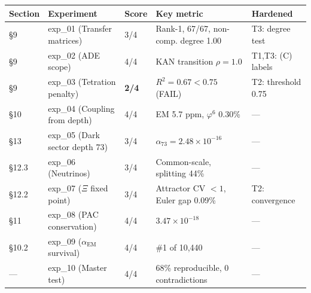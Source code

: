 \documentclass[11pt,a4paper]{article}
\begin{document}
\begin{longtable}[]{@{}lllll@{}}
\toprule
Section & Experiment & Score & Key metric & Hardened \\
\midrule\endhead
§9 & exp\_01 (Transfer matrices) & 3/4 & Rank-1, 67/67, non-comp. degree 1.00 & T3: degree test \\
§9 & exp\_02 (ADE scope) & 4/4 & KAN transition $\rho = 1.0$ & T1,T3: (C) labels \\
§9 & exp\_03 (Tetration penalty) & \textbf{2/4} & $R^2 = 0.67 < 0.75$ (FAIL) & T2: threshold 0.75 \\
§10 & exp\_04 (Coupling from depth) & 4/4 & EM 5.7 ppm, $\varphi^6$ 0.30\% & — \\
§13 & exp\_05 (Dark sector depth 73) & 3/4 & $\alpha_{73} = 2.48 \times 10^{-16}$ & — \\
§12.3 & exp\_06 (Neutrinos) & 3/4 & Common-scale, splitting 44\% & — \\
§12.2 & exp\_07 ($\Xi$ fixed point) & 3/4 & Attractor CV $< 1$, Euler gap 0.09\% & T2: convergence \\
§11 & exp\_08 (PAC conservation) & 4/4 & $3.47 \times 10^{-18}$ & — \\
§10.2 & exp\_09 ($\alpha_{\text{EM}}$ survival) & 4/4 & \#1 of 10,440 & — \\
— & exp\_10 (Master test) & 4/4 & 68\% reproducible, 0 contradictions & — \\
\bottomrule
\end{longtable}
\end{document}
